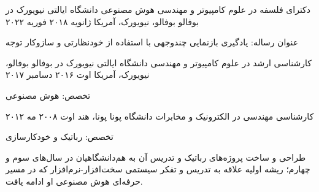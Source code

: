 

\begin{cventries}

\cventry
{دکترای فلسفه  در علوم کامپیوتر و مهندسی  هوش مصنوعی}
{دانشگاه ایالتی نیویورک در بوفالو}
{بوفالو، نیویورک، آمریکا}
{ژانویه ۲۰۱۸  فوریه ۲۰۲۲}
{\begin{cvitems}\item {عنوان رساله: یادگیری بازنمایی چندوجهی با استفاده از خودنظارتی و سازوکار توجه}\end{cvitems}}

\cventry
{کارشناسی ارشد  در علوم کامپیوتر و مهندسی}
{دانشگاه ایالتی نیویورک در بوفالو}
{بوفالو، نیویورک، آمریکا}
{اوت ۲۰۱۶  دسامبر ۲۰۱۷}
{\begin{cvitems}\item {تخصص: هوش مصنوعی}\end{cvitems}}

\cventry
{کارشناسی مهندسی  در الکترونیک و مخابرات}
{دانشگاه پونا}
{پونا، هند}
{اوت ۲۰۰۸  مه ۲۰۱۲}
{\begin{cvitems}\item {تخصص: رباتیک و خودکارسازی}\item {طراحی و ساخت پروژه‌های رباتیک و تدریس آن به هم‌دانشگاهیان در سال‌های سوم و چهارم؛ ریشه اولیه علاقه به تدریس و تفکر سیستمی سخت‌افزار-نرم‌افزار که در مسیر حرفه‌ای هوش مصنوعی او ادامه یافت.}\end{cvitems}}

\end{cventries}
